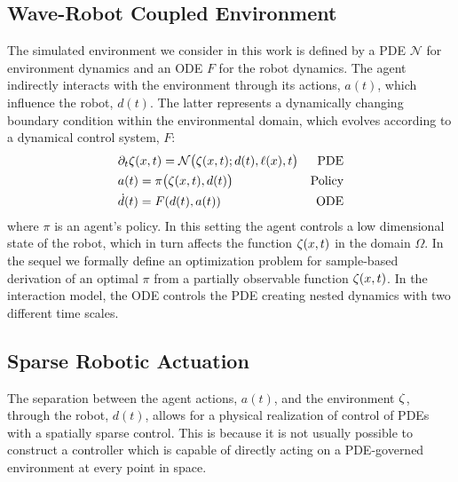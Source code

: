 \subsection{Wave-Robot Coupled Environment}
The simulated environment we consider in this work is defined by a PDE $\mathcal{N}$ for environment dynamics and an ODE $F$ for the robot dynamics. The agent indirectly interacts with the environment through its actions, $a(t)$, which influence the robot, $d(t)$. The latter represents a dynamically changing boundary condition within the environmental domain, which evolves according to a dynamical control system, $F$:
\begin{align}
     &\partial_t \zeta(x, t) = \mathcal{N}\bigl(\zeta(x, t);d(t), \ell(x), t\bigr)&\text{PDE}\label{eq:truePDE}\\
     &a(t) = \pi\bigl(\zeta(x, t), d(t)\bigr)&\text{Policy}\label{eq:policy}\\
     &\dot{d}(t) = F(d(t), a(t))&\text{ODE}\label{eq:design_dynamics}
\end{align}
where $\pi$ is an agent's policy. In this setting the agent controls a low dimensional state of the robot, which in turn affects the function $\zeta(x, t)$ in the domain $\Omega$. In the sequel we formally define an optimization problem for sample-based derivation of an optimal $\pi$ from a partially observable function $\zeta(x, t)$. In the interaction model, the ODE controls the PDE creating nested dynamics with two different time scales. 

\subsection{Sparse Robotic Actuation}

The separation between the agent actions, $a(t)$, and the environment $\zeta$, through the robot, $d(t)$, allows for a physical realization of control of PDEs with a spatially sparse control. 
This is because it is not usually possible to construct a controller which is capable of directly acting on a PDE-governed environment at every point in space. 

